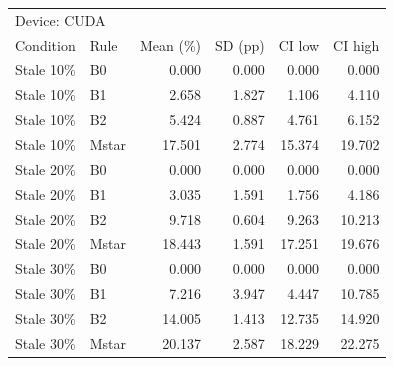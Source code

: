 \begin{tabular}{llrrrr}
\toprule
\multicolumn{6}{l}{Device: CUDA} \\
Condition & Rule & Mean (\%) & SD (pp) & CI low & CI high \\
\midrule
Stale 10\% & B0 & 0.000 & 0.000 & 0.000 & 0.000 \\
Stale 10\% & B1 & 2.658 & 1.827 & 1.106 & 4.110 \\
Stale 10\% & B2 & 5.424 & 0.887 & 4.761 & 6.152 \\
Stale 10\% & Mstar & 17.501 & 2.774 & 15.374 & 19.702 \\
Stale 20\% & B0 & 0.000 & 0.000 & 0.000 & 0.000 \\
Stale 20\% & B1 & 3.035 & 1.591 & 1.756 & 4.186 \\
Stale 20\% & B2 & 9.718 & 0.604 & 9.263 & 10.213 \\
Stale 20\% & Mstar & 18.443 & 1.591 & 17.251 & 19.676 \\
Stale 30\% & B0 & 0.000 & 0.000 & 0.000 & 0.000 \\
Stale 30\% & B1 & 7.216 & 3.947 & 4.447 & 10.785 \\
Stale 30\% & B2 & 14.005 & 1.413 & 12.735 & 14.920 \\
Stale 30\% & Mstar & 20.137 & 2.587 & 18.229 & 22.275 \\
\bottomrule
\end{tabular}
